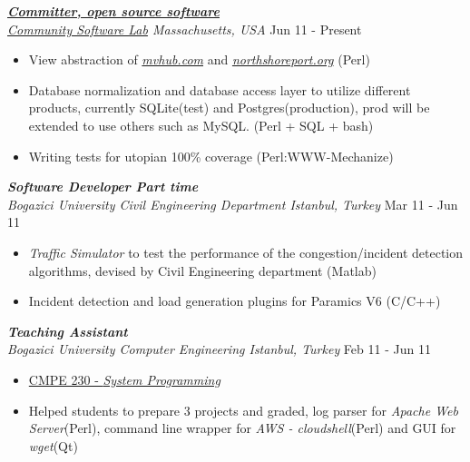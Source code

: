 \documentclass[line, margin]{res}
\begin{document}
\begin{resume}
	{\sl \textbf{\href{https://launchpad.net/mvhub}{Committer, open source software}} \\ \href{http://thecsl.org/}{Community Software Lab} Massachusetts, USA} \hfill Jun 11 - Present \\
	\vspace{-0.3cm}
	\begin{itemize} \itemsep -2pt
		\item View abstraction of \textit{\href{http://mvhub.com/}{mvhub.com}} and \textit{\href{http://northshoreport.org/}{northshoreport.org}} (Perl)
		\item Database normalization and database access layer to utilize different products, currently SQLite(test) and Postgres(production), prod will be extended to use others such as MySQL. (Perl + SQL + bash)
		\item Writing tests for utopian 100\% coverage (Perl:WWW-Mechanize)
	\end{itemize}

	{\sl \textbf{Software Developer Part time} \\ Bogazici University Civil Engineering Department Istanbul, Turkey} \hfill Mar 11 - Jun 11 \\
	\vspace{-0.3cm}
	\begin{itemize} \itemsep -2pt
		\item \textit{Traffic Simulator} to test the performance of the congestion/incident detection algorithms, devised by Civil Engineering department (Matlab)
		\item Incident detection and load generation plugins for Paramics V6 (C/C++)
	\end{itemize}

	{\sl \textbf{Teaching Assistant} \\ Bogazici University Computer Engineering Istanbul, Turkey} \hfill Feb 11 - Jun 11 \\
	\vspace{-.3cm} 
	\begin{itemize} \itemsep -2pt
		\item \href{http://www.cmpe.boun.edu.tr/courses/?cmpe=230}{CMPE 230 - \textit{System Programming}}
		\item Helped students to prepare 3 projects and graded, log parser for \textit{Apache Web Server}(Perl), command line wrapper for \textit{AWS - cloudshell}(Perl) and GUI for \textit{wget}(Qt)
	\end{itemize}


\end{resume}
\end{document}
